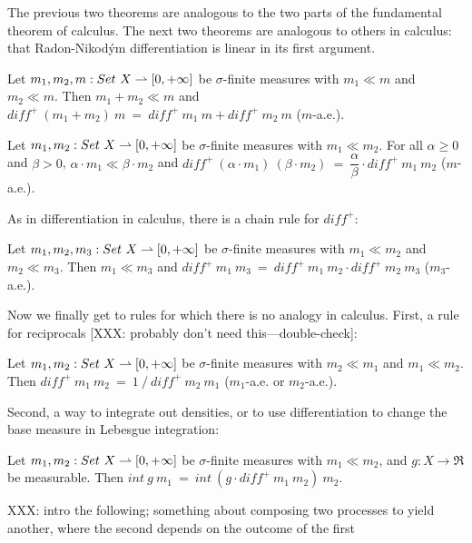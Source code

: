 The previous two theorems are analogous to the two parts of the fundamental theorem of calculus.
The next two theorems are analogous to others in calculus: that Radon-Nikod\'ym differentiation is linear in its first argument.

\begin{lemma}
\label{lem:diff-distributes-over-addition}
Let $m_1,m_2,m : Set~X \rightharpoonup [0,+\infty]$ be $\sigma$-finite measures with $m_1 \ll m$ and $m_2 \ll m$.
Then $m_1 + m_2 \ll m$ and $diff^+~(m_1 + m_2)~m\ =\ diff^+~m_1~m + diff^+~m_2~m$ ($m$-a.e.).
\end{lemma}

\begin{lemma}
\label{lem:diff-distributes-over-scaling}
Let $m_1,m_2 : Set~X \rightharpoonup [0,+\infty]$ be $\sigma$-finite measures with $m_1 \ll m_2$.
For all $\alpha \ge 0$ and $\beta > 0$, $\alpha \cdot m_1 \ll \beta \cdot m_2$ and $diff^+~(\alpha \cdot m_1)~(\beta \cdot m_2)\ =\ \dfrac{\alpha}{\beta} \cdot diff^+~m_1~m_2$ ($m$-a.e.).
\end{lemma}

As in differentiation in calculus, there is a chain rule for $diff^+$:
\begin{lemma}
\label{lem:diff-chain-rule}
Let $m_1,m_2,m_3 : Set~X \rightharpoonup [0,+\infty]$ be $\sigma$-finite measures with $m_1 \ll m_2$ and $m_2 \ll m_3$.
Then $m_1 \ll m_3$ and $diff^+~m_1~m_3\ =\ diff^+~m_1~m_2 \cdot diff^+~m_2~m_3$ ($m_3$-a.e.).
\end{lemma}

Now we finally get to rules for which there is no analogy in calculus.
First, a rule for reciprocals [XXX: probably don't need this---double-check]:
\begin{lemma}
\label{lem:diff-reciprocal-rule}
Let $m_1,m_2 : Set~X \rightharpoonup [0,+\infty]$ be $\sigma$-finite measures with $m_2 \ll m_1$ and $m_1 \ll m_2$.
Then $diff^+~m_1~m_2\ =\ 1~{/}~diff^+~m_2~m_1$ ($m_1$-a.e. or $m_2$-a.e.).
\end{lemma}

Second, a way to integrate out densities, or to use differentiation to change the base measure in Lebesgue integration:
\begin{lemma}
\label{lem:diff-change-measure}
Let $m_1,m_2 : Set~X \rightharpoonup [0,+\infty]$ be $\sigma$-finite measures with $m_1 \ll m_2$, and $g : X \to \Re$ be measurable.
Then $int~g~m_1\ =\ int~(g \cdot diff^+~m_1~m_2)~m_2$.
\end{lemma}

XXX: intro the following; something about composing two processes to yield another, where the second depends on the outcome of the first

